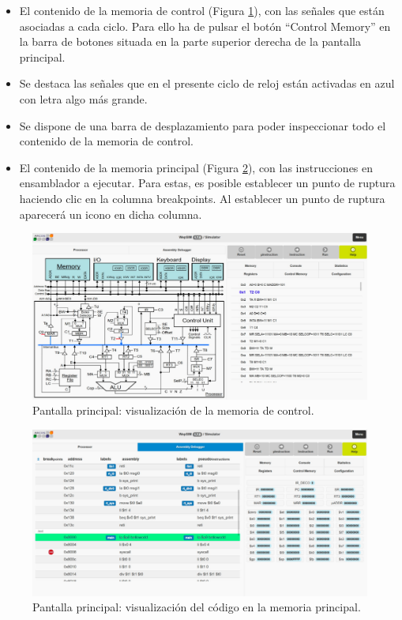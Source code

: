 \begin{itemize}

\item El contenido de la memoria de control (Figura \ref{fig:anexob-7}), con las señales que están asociadas a cada ciclo. Para ello ha de pulsar el botón ``Control Memory'' en la barra de botones situada en la parte superior derecha de la pantalla principal.

\item Se destaca las señales que en el presente ciclo de reloj están activadas en azul con letra algo más grande.

\item Se dispone de una barra de desplazamiento para poder inspeccionar todo el contenido de la memoria de control.

\item El contenido de la memoria principal (Figura \ref{fig:anexob-8}), con las instrucciones en ensamblador a ejecutar. Para estas, es posible establecer un punto de ruptura haciendo clic en la columna breakpoints. Al establecer un punto de ruptura aparecerá un icono en dicha columna.

\end{itemize}

\begin{figure}[htbp]
 	\centering
 	\includegraphics[width=15cm]{figures/anexob-7}
 	\caption{Pantalla principal: visualización de la memoria de control.}
	\label{fig:anexob-7}
\end{figure}

\begin{figure}[htbp]
 	\centering
 	\includegraphics[width=15cm]{figures/anexob-8}
 	\caption{Pantalla principal: visualización del código en la memoria principal.}
	\label{fig:anexob-8}
\end{figure}

